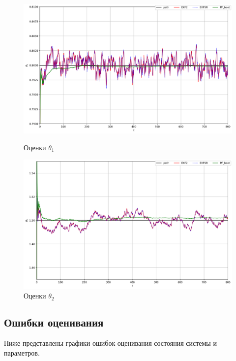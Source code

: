 \documentclass[a4paper,12pt]{article}
\begin{document}
\begin{landscape}
\begin{figure}[p]
\centering
\caption{Оценки $\theta_1$}
\includegraphics[width=0.95\linewidth]{theta1.png}
\label{theta1}
\end{figure}

\begin{figure}[p]
\centering
\caption{Оценки $\theta_2$}
\includegraphics[width=0.95\linewidth]{theta2.png}

\label{fig:theta2}
\end{figure}
\end{landscape}

\subsection{Ошибки оценивания}
Ниже представлены графики ошибок оценивания состояния системы и параметров.
\end{document}
